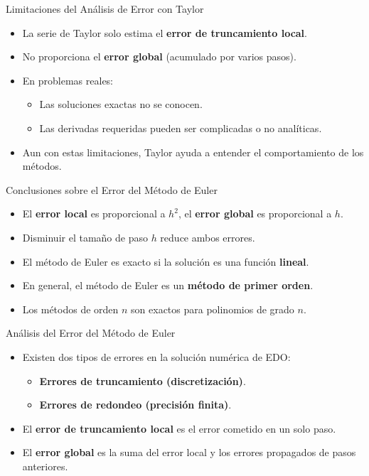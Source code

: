 \documentclass[main.tex]{subfiles}
\begin{document}
\begin{frame}{\small Limitaciones del An\'alisis de Error con Taylor}
\begin{itemize}
  \item La serie de Taylor solo estima el \textbf{error de truncamiento local}.
  \item No proporciona el \textbf{error global} (acumulado por varios pasos).
  \item En problemas reales:
  \begin{itemize}
    \item Las soluciones exactas no se conocen.
    \item Las derivadas requeridas pueden ser complicadas o no anal\'iticas.
  \end{itemize}
  \item Aun con estas limitaciones, Taylor ayuda a entender el comportamiento de los m\'etodos.
\end{itemize}
\end{frame}

\begin{frame}{\small Conclusiones sobre el Error del M\'etodo de Euler}
\begin{itemize}
  \item El \textbf{error local} es proporcional a $h^2$, el \textbf{error global} es proporcional a $h$.
  \item Disminuir el tama\~no de paso $h$ reduce ambos errores.
  \item El m\'etodo de Euler es exacto si la soluci\'on es una funci\'on \textbf{lineal}.
  \item En general, el m\'etodo de Euler es un \textbf{m\'etodo de primer orden}.
  \item Los m\'etodos de orden $n$ son exactos para polinomios de grado $n$.
\end{itemize}
\end{frame}

\begin{frame}{\small An\'alisis del Error del M\'etodo de Euler}
\begin{itemize}
  \item Existen dos tipos de errores en la soluci\'on num\'erica de EDO:
  \begin{itemize}
    \item \textbf{Errores de truncamiento (discretizaci\'on)}.
    \item \textbf{Errores de redondeo (precisi\'on finita)}.
  \end{itemize}
  \item El \textbf{error de truncamiento local} es el error cometido en un solo paso.
  \item El \textbf{error global} es la suma del error local y los errores propagados de pasos anteriores.
\end{itemize}
\end{frame}
\end{document}
